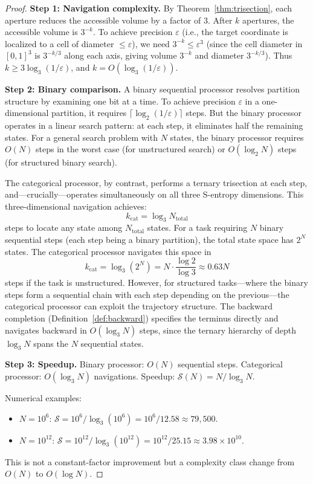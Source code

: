 \documentclass[twocolumn,10pt]{article}
\theoremstyle{remark}
\newcommand{\eps}{\varepsilon}
\begin{document}
\begin{proof}
\textbf{Step 1: Navigation complexity.}
By Theorem~\ref{thm:trisection}, each aperture reduces the accessible volume by a factor of 3. After $k$ apertures, the accessible volume is $3^{-k}$. To achieve precision $\eps$ (i.e., the target coordinate is localized to a cell of diameter $\leq \eps$), we need $3^{-k} \leq \eps^3$ (since the cell diameter in $[0,1]^3$ is $3^{-k/3}$ along each axis, giving volume $3^{-k}$ and diameter $3^{-k/3}$). Thus $k \geq 3\log_3(1/\eps)$, and $k = O(\log_3(1/\eps))$.

\textbf{Step 2: Binary comparison.}
A binary sequential processor resolves partition structure by examining one bit at a time. To achieve precision $\eps$ in a one-dimensional partition, it requires $\lceil \log_2(1/\eps) \rceil$ steps. But the binary processor operates in a linear search pattern: at each step, it eliminates half the remaining states. For a general search problem with $N$ states, the binary processor requires $O(N)$ steps in the worst case (for unstructured search) or $O(\log_2 N)$ steps (for structured binary search).

The categorical processor, by contrast, performs a ternary trisection at each step, and---crucially---operates simultaneously on all three S-entropy dimensions. This three-dimensional navigation achieves:
\begin{equation}
k_{\mathrm{cat}} = \log_3 N_{\mathrm{total}}
\end{equation}
steps to locate any state among $N_{\mathrm{total}}$ states. For a task requiring $N$ binary sequential steps (each step being a binary partition), the total state space has $2^N$ states. The categorical processor navigates this space in
\begin{equation}
k_{\mathrm{cat}} = \log_3(2^N) = N \cdot \frac{\log 2}{\log 3} \approx 0.63 N
\end{equation}
steps if the task is unstructured. However, for structured tasks---where the binary steps form a sequential chain with each step depending on the previous---the categorical processor can exploit the trajectory structure. The backward completion (Definition~\ref{def:backward}) specifies the terminus directly and navigates backward in $O(\log_3 N)$ steps, since the ternary hierarchy of depth $\log_3 N$ spans the $N$ sequential states.

\textbf{Step 3: Speedup.}
Binary processor: $O(N)$ sequential steps.
Categorical processor: $O(\log_3 N)$ navigations.
Speedup: $\mathcal{S}(N) = N / \log_3 N$.

Numerical examples:
\begin{itemize}
\item $N = 10^6$: $\mathcal{S} = 10^6 / \log_3(10^6) = 10^6 / 12.58 \approx 79{,}500$.
\item $N = 10^{12}$: $\mathcal{S} = 10^{12} / \log_3(10^{12}) = 10^{12} / 25.15 \approx 3.98 \times 10^{10}$.
\end{itemize}

This is not a constant-factor improvement but a complexity class change from $O(N)$ to $O(\log N)$.
\end{proof}
\end{document}
